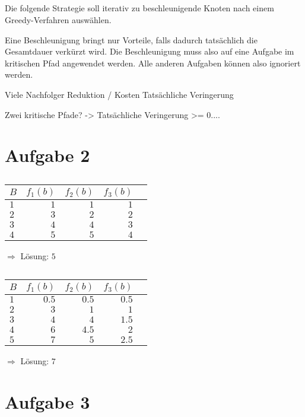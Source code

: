 \documentclass[a4paper]{article}
\begin{document}
\subsection{}
Die folgende Strategie soll iterativ zu beschleunigende Knoten nach einem
Greedy-Verfahren auswählen.

Eine Beschleunigung bringt nur Vorteile, falls dadurch tatsächlich die
Gesamtdauer verkürzt wird. Die Beschleunigung muss also auf eine Aufgabe im
kritischen Pfad angewendet werden. Alle anderen Aufgaben können also
ignoriert werden.

Viele Nachfolger
Reduktion / Kosten
Tatsächliche Veringerung

Zwei kritische Pfade? -> Tatsächliche Veringerung >= 0....

\section{Aufgabe 2}
\subsection{}
\begin{tabular}{l|rrrr}
$B$ & $f_1(b)$ & $f_2(b)$ & $f_3(b)$ \\
\hline
$1$ & $1$ & $1$ & $1$  \\
$2$ & $3$ & $2$ & $2$  \\
$3$ & $4$ & $4$ & $3$  \\
$4$ & $5$ & $5$ & $4$  \\
\end{tabular}

$\Rightarrow$ Lösung: $5$

\subsection{}

\begin{tabular}{l|rrrr}
$B$ & $f_1(b)$ & $f_2(b)$ & $f_3(b)$ \\
\hline
$1$ & $0.5$ & $0.5$ & $0.5$  \\
$2$ & $3$ & $1$ & $1$  \\
$3$ & $4$ & $4$ & $1.5$  \\
$4$ & $6$ & $4.5$ & $2$  \\
$5$ & $7$ & $5$ & $2.5$  \\
\end{tabular}

$\Rightarrow$ Lösung: $7$

\section{Aufgabe 3}
\end{document}
